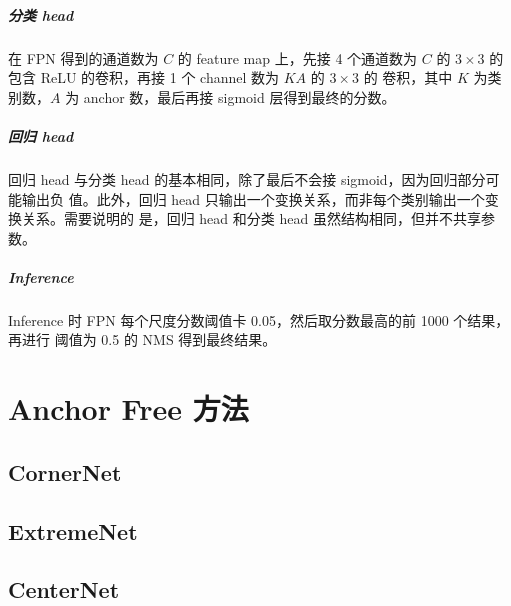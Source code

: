 \paragraph{分类 head}
在 FPN 得到的通道数为 $C$ 的 feature map 上，先接 4 个通道数为 $C$ 的
$3 \times 3$ 的包含 ReLU 的卷积，再接 1 个 channel 数为 $KA$ 的 $3 \times 3$ 的
卷积，其中 $K$ 为类别数，$A$ 为 anchor 数，最后再接 sigmoid 层得到最终的分数。

\paragraph{回归 head}
回归 head 与分类 head 的基本相同，除了最后不会接 sigmoid，因为回归部分可能输出负
值。此外，回归 head 只输出一个变换关系，而非每个类别输出一个变换关系。需要说明的
是，回归 head 和分类 head 虽然结构相同，但并不共享参数。

\paragraph{Inference}
Inference 时 FPN 每个尺度分数阈值卡 0.05，然后取分数最高的前 1000 个结果，再进行
阈值为 0.5 的 NMS 得到最终结果。

\chapter{Anchor Free 方法}

\section{CornerNet}
\label{sec:CornerNet}

\section{ExtremeNet}
\label{sec:ExtremeNet}

\section{CenterNet}
\label{sec:CenterNet}


